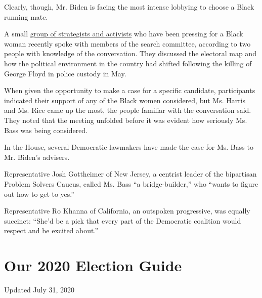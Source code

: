 Clearly, though, Mr. Biden is facing the most intense lobbying to choose
a Black running mate.

A small
\href{https://www.nytimes3xbfgragh.onion/2020/06/10/us/politics/joe-biden-black-vice-president.html}{group
of strategists and activists} who have been pressing for a Black woman
recently spoke with members of the search committee, according to two
people with knowledge of the conversation. They discussed the electoral
map and how the political environment in the country had shifted
following the killing of George Floyd in police custody in May.

When given the opportunity to make a case for a specific candidate,
participants indicated their support of any of the Black women
considered, but Ms. Harris and Ms. Rice came up the most, the people
familiar with the conversation said. They noted that the meeting
unfolded before it was evident how seriously Ms. Bass was being
considered.

In the House, several Democratic lawmakers have made the case for Ms.
Bass to Mr. Biden's advisers.

Representative Josh Gottheimer of New Jersey, a centrist leader of the
bipartisan Problem Solvers Caucus, called Ms. Bass ``a bridge-builder,''
who ``wants to figure out how to get to yes.''

Representative Ro Khanna of California, an outspoken progressive, was
equally succinct: ``She'd be a pick that every part of the Democratic
coalition would respect and be excited about.''

\hypertarget{our-2020-election-guide}{%
\section{Our 2020 Election Guide}\label{our-2020-election-guide}}

Updated July 31, 2020


